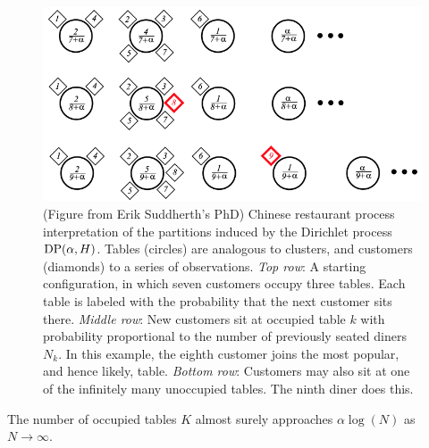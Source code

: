 \begin{figure}[htp!]
	\centering
	\includegraphics[width=1\textwidth]{np/dp/crp}
	\caption{(Figure from Erik Suddherth's PhD) Chinese restaurant process interpretation of the partitions induced by the Dirichlet process $\operatorname{DP}(\alpha, H)$. Tables (circles) are analogous to clusters, and customers (diamonds) to a series of observations. \emph{Top row}: A starting configuration, in which seven customers occupy three tables. Each table is labeled with the probability that the next customer sits there. \emph{Middle row}: New customers sit at occupied table $k$ with probability proportional to the number of previously seated diners $N_k$. In this example, the eighth customer joins the most popular, and hence likely, table. \emph{Bottom row}: Customers may also sit at one of the infinitely many unoccupied tables. The ninth diner does this.}
\end{figure}

The number of occupied tables $K$ almost surely approaches $\alpha \log(N)$ as $N \to \infty$.